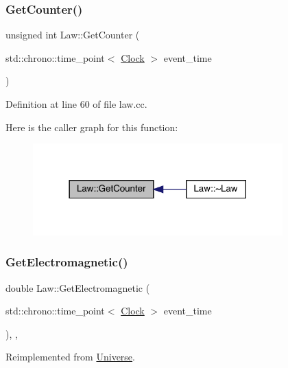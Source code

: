 \subsubsection{\texorpdfstring{Get\+Counter()}{GetCounter()}}
{\footnotesize\ttfamily unsigned int Law\+::\+Get\+Counter (\begin{DoxyParamCaption}\item[{std\+::chrono\+::time\+\_\+point$<$ \hyperlink{universe_8h_a0ef8d951d1ca5ab3cfaf7ab4c7a6fd80}{Clock} $>$}]{event\+\_\+time }\end{DoxyParamCaption})}



Definition at line 60 of file law.\+cc.

Here is the caller graph for this function\+:
\nopagebreak
\begin{figure}[H]
\begin{center}
\leavevmode
\includegraphics[width=273pt]{class_law_ab30a86ef88a85e13d3e598caa45bff05_icgraph}
\end{center}
\end{figure}
\mbox{\label{class_law_a01eba6e68d2d8a717e2b4789be90853d}} 
\subsubsection{\texorpdfstring{Get\+Electromagnetic()}{GetElectromagnetic()}}
{\footnotesize\ttfamily double Law\+::\+Get\+Electromagnetic (\begin{DoxyParamCaption}\item[{std\+::chrono\+::time\+\_\+point$<$ \hyperlink{universe_8h_a0ef8d951d1ca5ab3cfaf7ab4c7a6fd80}{Clock} $>$}]{event\+\_\+time }\end{DoxyParamCaption})\hspace{0.3cm}{\ttfamily [inline]}, {\ttfamily [final]}, {\ttfamily [virtual]}}



Reimplemented from \hyperlink{class_universe_a63b850ef3f3394313353109d222bf5d1}{Universe}.



